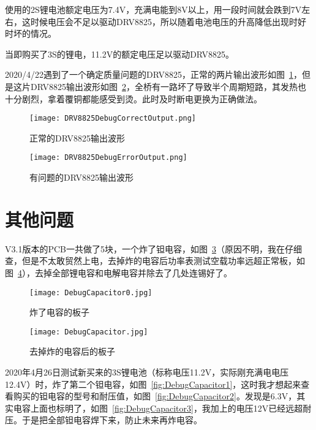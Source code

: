 使用的2S锂电池额定电压为7.4V，充满电能到8V以上，用一段时间就会跌到7V左右，这时候电压会不足以驱动DRV8825，所以随着电池电压的升高降低出现时好时坏的情况。

当即购买了3S的锂电，11.2V的额定电压足以驱动DRV8825。

2020/4/22遇到了一个确定质量问题的DRV8825，正常的两片输出波形如图~\ref{fig:DRV8825DebugCorrectOutput}，但是这片DRV8825输出波形如图~\ref{fig:DRV8825DebugErrorOutput}，全桥有一路坏了导致半个周期短路，其发热也十分剧烈，拿着覆铜都能感受到烫。此时及时断电更换为正确做法。

\begin{figure}[htbp]
    \centering
    \texttt{[image: DRV8825DebugCorrectOutput.png]}
    \caption{正常的DRV8825输出波形}
    \label{fig:DRV8825DebugCorrectOutput}
\end{figure}

\begin{figure}[htbp]
    \centering
    \texttt{[image: DRV8825DebugErrorOutput.png]}
    \caption{有问题的DRV8825输出波形}
    \label{fig:DRV8825DebugErrorOutput}
\end{figure}


\section{其他问题}

V3.1版本的PCB一共做了5块，一个炸了钽电容，如图~\ref{fig:DebugCapacitor0}（原因不明，我在仔细查，但是不太敢贸然上电，去掉炸的电容后功率表测试空载功率远超正常板，如图~\ref{fig:DebugCapacitor}），去掉全部锂电容和电解电容并除去了几处连锡好了。

\begin{figure}[htbp]
    \centering
    \texttt{[image: DebugCapacitor0.jpg]}
    \caption{炸了电容的板子}
    \label{fig:DebugCapacitor0}
\end{figure}

\begin{figure}[htbp]
    \centering
    \texttt{[image: DebugCapacitor.jpg]}
    \caption{去掉炸的电容后的板子}
    \label{fig:DebugCapacitor}
\end{figure}

2020年4月26日测试新买来的3S锂电池（标称电压11.2V，实际刚充满电电压12.4V）时，炸了第二个钽电容，如图~\ref{fig:DebugCapacitor1}，这时我才想起来查看购买的钽电容的型号和耐压值，如图~\ref{fig:DebugCapacitor2}。发现是6.3V，其实电容上面也标明了，如图~\ref{fig:DebugCapacitor3}，我加上的电压12V已经远超耐压。于是把全部钽电容焊下来，防止未来再炸电容。

